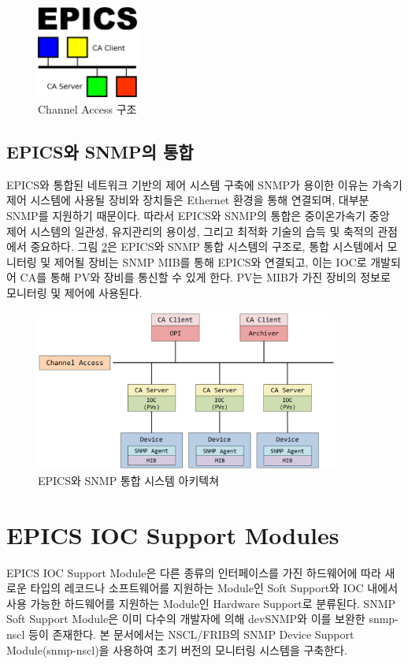 \documentclass[11pt
  , a4paper
  , article
  , oneside
]{memoir}
\begin{document}
\begin{figure}[h!]
  \centering
  \includegraphics[width=0.3\textwidth]{./images/epics.eps}
  \caption{Channel Access 구조}
  \label{fig:ca}     
\end{figure}

\section{EPICS와 SNMP의 통합}
EPICS와 통합된 네트워크 기반의 제어 시스템 구축에 SNMP가 용이한 이유는 가속기 제어 시스템에 사용될 장비와 장치들은 Ethernet 환경을 통해 연결되며, 대부분 SNMP를 지원하기 때문이다. 따라서 EPICS와 SNMP의 통합은 중이온가속기 중앙 제어 시스템의 일관성, 유지관리의 용이성, 그리고 최적화 기술의 습득 및 축적의 관점에서 중요하다. 그림 \ref{fig:architecture}은 EPICS와 SNMP 통합 시스템의 구조로, 통합 시스템에서 모니터링 및 제어될 장비는 SNMP MIB를 통해 EPICS와 연결되고, 이는 IOC로 개발되어 CA를 통해 PV와 장비를 통신할 수 있게 한다. PV는 MIB가 가진 장비의 정보로 모니터링 및 제어에 사용된다\citep{epicssnmp}. 

\begin{figure}[h!]
  \centering
  \includegraphics[width=0.89\textwidth]{./images/architecture.eps}
  \caption{EPICS와 SNMP 통합 시스템 아키텍쳐}
  \label{fig:architecture}   
\end{figure}

\chapter{EPICS IOC Support Modules}
EPICS IOC Support Module은 다른 종류의 인터페이스를 가진 하드웨어에 따라 새로운 타입의 레코드나 소프트웨어를 지원하는 Module인 Soft Support와 IOC 내에서 사용 가능한 하드웨어를 지원하는 Module인 Hardware Support로 분류된다. SNMP Soft Support Module은 이미 다수의 개발자에 의해 devSNMP와 이를 보완한 snmp-nscl 등이 존재한다. 본 문서에서는 NSCL/FRIB의 SNMP Device Support Module(snmp-nscl)을 사용하여 초기 버전의 모니터링 시스템을 구축한다\citep{modules}.
\end{document}
